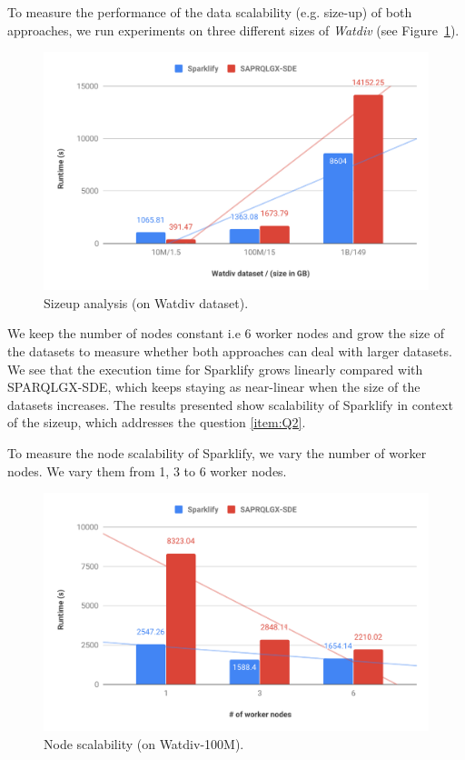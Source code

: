 To measure the performance of the data scalability (e.g. size-up) of both approaches, we run experiments on three different sizes of \textit{Watdiv} (see Figure~\ref{fig:sparklify-sizeup-scalability}).

\begin{figure}
 \includegraphics[width=1.0\columnwidth]{images/6_scalable_rdf_querying/sparklify-sizeup-scalability.pdf}
    \caption{Sizeup analysis (on Watdiv dataset).}
    \label{fig:sparklify-sizeup-scalability}
\end{figure}

We keep the number of nodes constant i.e 6 worker nodes and grow the size of the datasets to measure whether both approaches can deal with larger datasets.
We see that the execution time for Sparklify grows linearly compared with SPARQLGX-SDE, which keeps staying as near-linear when the size of the datasets increases. 
The results presented show scalability of Sparklify in context of the sizeup, which addresses the question \ref{item:Q2}.

To measure the node scalability of Sparklify, we vary the number of worker nodes.
We vary them from 1, 3 to 6 worker nodes.

\begin{figure}
  \includegraphics[width=1.0\columnwidth]{images/6_scalable_rdf_querying/sparklify-node-scalability.pdf}
    \caption{Node scalability (on Watdiv-100M).}
    \label{fig:sparklify-node-scalability}
\end{figure}

